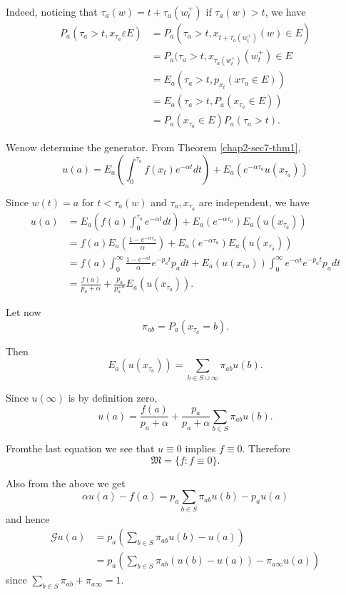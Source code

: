 Indeed, noticing that $\tau_a (w) = t + \tau_a (w^+_t)$ if $\tau_a (w)
> t$, we have 
\begin{align*}
  P_a (\tau_a > t,x_{\tau_a} \varepsilon E) & = P_a (\tau_a > t, x_{t +
  \tau_a (w^+_t)}(w) \in E)\\ 
  &= P_a (\tau_a > t, x _{\tau_a (w^+_t)}(w^+_t) \in E\\
  & = E_a (\tau_a > t, p_{x_t} (x\tau_a \in E))\\
  & = E_a (\tau_a > t, P_a (x_{\tau_a} \in E)) \\
  & = P_a (x_{\tau_a} \in E) P_a (\tau_a > t).
\end{align*}

We\pageoriginale now determine the generator. From
Theorem \ref{chap2-sec7-thm1}, 
$$
u (a) = E_a \left(\int_0^{\tau_a} f (x_t)e^{- \alpha t} dt\right) + E_a
(e^{-\alpha \tau_a} u(x_{\tau_a})) 
$$

Since $w (t) = a $ for $t < \tau_a (w)$ and $\tau_a, x_{\tau{_a}}$ are
independent, we have 
\begin{align*}
  u (a) & = E_a \left(f (a) \int^{\tau_a}_0 e^{-\alpha t} dt\right) + E_a
  (e^{-\alpha \tau_a}) E_a (u (x_{\tau{_a}}))\\ 
  & = f (a) E_a \left(\frac{1-e^{-\alpha \tau_a}} {\alpha}\right) + E_a (e^{-
    \alpha \tau_a}) E_a (u (x_{\tau_{a}}))\\ 
  & = f (a) \int^\infty_0 \frac{1-e^{- \alpha t}}{\alpha} e^{-p_at}
  p_a dt+ E_a (u (x_\tau{_a})) \int^\infty_0 e^{-\alpha t}
  e^{-p_at} p_a dt\\ 
  & = \frac{f(a)}{p_a+\alpha} +\frac{p_a}{p_a^{+\alpha}} E_a (u (x_{\tau_a})).
\end{align*}

Let now
$$
\pi_{ab} = P_a(x_{\tau{_a}}=b).
$$

Then
$$
E_a (u (x_{\tau_{a}})) = \sum_{b \in S \cup \infty} \pi_{ab} u (b).
$$

Since $u (\infty)$ is by definition zero,
$$
u(a) = \frac{f(a)}{p_a+ \alpha} + \frac{p_a}{p_a+\alpha}
\sum_{b \in S} \pi_{ab} u (b). 
$$

From\pageoriginale the last equation we see that $u \equiv 0$ implies $f \equiv
0$. Therefore 
$$
\mathfrak{M} = \big\{ f : f \equiv 0\big\}.
$$

Also from the above we get
$$
\alpha u (a) - f(a) = p_a \sum_{b \in S} \pi_{ab} u (b) -p_a u (a)
$$
and hence
\begin{align*}
  \mathscr{G} u (a) & = p_a \left(\sum_{b \in S} \pi_{ab} u
  (b) - u (a)\right)\\ 
  & = p_a \left(\sum_{b \in S} \pi_{ab} (u (b) -u (a)) -
  \pi_{a \infty} u (a)\right) 
\end{align*}
since \quad $\sum\limits_{b \in S} \pi_{ab} + \pi_{a \infty} = 1$.

